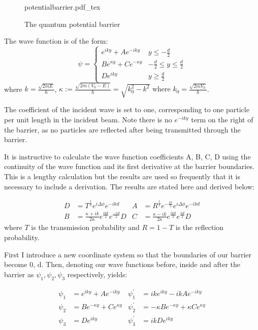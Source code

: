 \documentclass{article}
\newcommand{\incfig}[1]{%
    \def\svgwidth{10cm}
    {#1.pdf_tex}
}
\begin{document}
\begin{figure}[ht]
    \centering
    \incfig{potentialbarrier}
    \caption{The quantum potential barrier}
    \label{fig:potentialbarrier}
\end{figure}

\noindent The wave function is of the form:
\begin{equation}
	\psi = 
	\begin{cases}
		e^{iky} + Ae^{-iky} & y \leq -\frac{d}{2} \\
		Be^{\kappa y} + Ce^{-\kappa y} & -\frac{d}{2} \leq y \leq \frac{d}{2} \\
		De^{iky} & y \geq \frac{d}{2}
	\end{cases}
	\label{wavefunction}
\end{equation}
\noindent where $k = \frac{\sqrt{2mE}}{\hbar}$, $\kappa := \frac{\sqrt{2m(V_0-E)}}{\hbar} = \sqrt{k_0^2-k^2} \text{ where } k_0 = \frac{\sqrt{2mV_0}}{\hbar}$. 

\noindent The coefficient of the incident wave is set to one, corresponding to one particle per unit length in the incident beam. Note there is no $e^{-iky}$ term on the right of the barrier, as no particles are reflected after being transmitted through the barrier.

\noindent It is instructive to calculate the wave function coefficients A, B, C, D using the continuity of the wave function and its first derivative at the barrier boundaries. This is a lengthy calculation but the results are used so frequently that it is necessary to include a derivation. The results are stated here and derived below:

\begin{align}
	D &= T^{\frac{1}{2}}e^{i\Delta\phi}e^{-ikd} & A &= R^{\frac{1}{2}}e^{-\frac{i\pi}{2}}e^{i\Delta\phi}e^{-ikd} \nonumber \\
	B &= \frac{\kappa+ik}{2\kappa}e^{\frac{ikd}{2}}e^{\frac{-\kappa d}{2}}D & C &= \frac{\kappa-ik}{2\kappa}e^{\frac{ikd}{2}}e^{\frac{\kappa d}{2}}D \label{cont0}
\end{align}
where $T$ is the transmission probability and $R = 1-T$ is the reflection probability.

\noindent First I introduce a new coordinate system so that the boundaries of our barrier become 0, d. Then, denoting our wave functions before, inside and after the barrier as $\psi_{1}, \psi_{2}, \psi_{3}$ respectively, yields:

\begin{align}
	\psi_{1} &= e^{iky} + Ae^{-iky} & \psi_{1}^{'} &= ike^{iky} - ikAe^{-iky} \\
	\psi_{2} &= Be^{-\kappa y} + Ce^{\kappa y} & \psi_{2}^{'} &= -\kappa Be^{-\kappa y} + \kappa Ce^{\kappa y} \\
	\psi_{3} &= De^{iky} & \psi_{3}^{'} &= ikDe^{iky}
\end{align}
\end{document}
